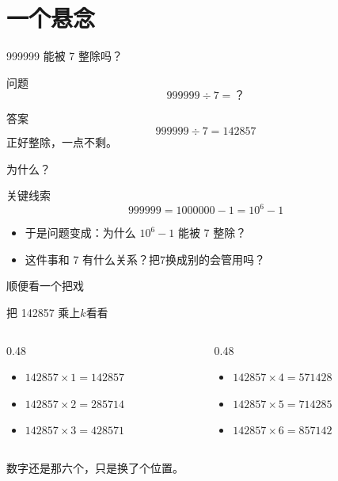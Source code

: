 \documentclass[10pt]{beamer}
\begin{document}
\section{一个悬念}

\begin{frame}{999999 能被 7 整除吗？}

  \begin{block}{问题}
    \[
      999999 \div 7 = ？
    \]
  \end{block}
  \begin{block}{答案}
    \[
      999999 \div 7 = 142857
    \]
    正好整除，一点不剩。
  \end{block}
\end{frame}

\begin{frame}{为什么？}
  \begin{block}{关键线索}
    \[
      999999 = 1000000 - 1 = 10^{6} - 1
    \]
  \end{block}

  \begin{itemize}
    \item 于是问题变成：为什么 \(10^{6} - 1\) 能被 7 整除？
    \item 这件事和 7 有什么关系？把7换成别的会管用吗？
  \end{itemize}


\end{frame}

\begin{frame}{顺便看一个把戏}

  \begin{block}{把 142857 乘上\(k\)看看}

     \begin{columns}[T]  %
       \begin{column}{0.48\textwidth}
          \begin{itemize}
            \item $142857 \times 1 = 142857$
            \item $142857 \times 2 = 285714$
            \item $142857 \times 3 = 428571$
          \end{itemize}
    \end{column}
    \begin{column}{0.48\textwidth}
 \begin{itemize}
      \item $142857 \times 4 = 571428$
      \item $142857 \times 5 = 714285$
      \item $142857 \times 6 = 857142$
    \end{itemize}
    \end{column}
  \end{columns}
  \end{block}
  \pause
    数字还是那六个，只是换了个位置。
\end{frame}
\end{document}
